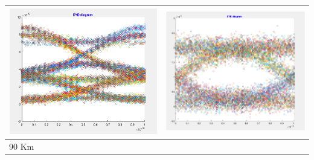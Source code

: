 \documentclass[12pt, a4paper]{article}
\begin{document}
\begin{table}[h!]
\begin{tabular}{ll}
  \includegraphics[scale = 0.7]{OFF60.png}        &       \includegraphics[scale = 0.73]{ON60.png}                       \\ \hline
90 Km  &                             \\ \hline

\end{tabular}
\end{table}
\end{document}
